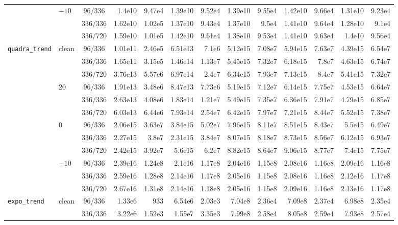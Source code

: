 \documentclass[12pt]{article}
\theoremstyle{definition}
\begin{document}
{\begin{enumerate}[label=\textbf{1.2.\arabic*}, leftmargin=*]
{\begin{longtable}{@{}llc@{\hspace{6pt}}rr@{\hspace{8pt}}rr@{\hspace{8pt}}rr@{\hspace{8pt}}rr@{\hspace{8pt}}rr@{}}
\addlinespace[2pt]
 & $-10$ & 96/336 & 1.4e10 & 9.47e4 & 1.39e10 & 9.52e4 & 1.39e10 & 9.55e4 & 1.42e10 & 9.66e4 & 1.31e10 & 9.23e4 \\
 &  & 336/336 & 1.62e10 & 1.02e5 & 1.37e10 & 9.43e4 & 1.37e10 & 9.5e4 & 1.41e10 & 9.64e4 & 1.28e10 & 9.1e4 \\
 &  & 336/720 & 1.59e10 & 1.01e5 & 1.42e10 & 9.61e4 & 1.38e10 & 9.53e4 & 1.41e10 & 9.63e4 & 1.4e10 & 9.56e4 \\
\midrule
\texttt{quadra\_trend} & clean & 96/336 & 1.01e11 & 2.46e5 & 6.51e13 & 7.1e6 & 5.12e15 & 7.08e7 & 5.94e15 & 7.63e7 & 4.39e15 & 6.54e7 \\
 &  & 336/336 & 1.65e11 & 3.15e5 & 1.46e14 & 1.13e7 & 5.45e15 & 7.32e7 & 6.18e15 & 7.8e7 & 4.63e15 & 6.74e7 \\
 &  & 336/720 & 3.76e13 & 5.57e6 & 6.97e14 & 2.4e7 & 6.34e15 & 7.93e7 & 7.13e15 & 8.4e7 & 5.41e15 & 7.32e7 \\
\addlinespace[2pt]
 & 20 & 96/336 & 1.91e13 & 3.48e6 & 8.47e13 & 7.73e6 & 5.19e15 & 7.12e7 & 6.14e15 & 7.75e7 & 4.53e15 & 6.64e7 \\
 &  & 336/336 & 2.63e13 & 4.08e6 & 1.83e14 & 1.21e7 & 5.49e15 & 7.35e7 & 6.36e15 & 7.91e7 & 4.79e15 & 6.85e7 \\
 &  & 336/720 & 6.03e13 & 6.44e6 & 7.93e14 & 2.54e7 & 6.42e15 & 7.97e7 & 7.21e15 & 8.44e7 & 5.52e15 & 7.38e7 \\
\addlinespace[2pt]
 & 0 & 96/336 & 2.06e15 & 3.63e7 & 3.84e15 & 5.02e7 & 7.96e15 & 8.11e7 & 8.51e15 & 8.43e7 & 5.5e15 & 6.49e7 \\
 &  & 336/336 & 2.27e15 & 3.8e7 & 2.31e15 & 3.84e7 & 8.07e15 & 8.18e7 & 8.73e15 & 8.56e7 & 6.12e15 & 6.93e7 \\
 &  & 336/720 & 2.42e15 & 3.92e7 & 5.6e15 & 6.2e7 & 8.82e15 & 8.64e7 & 9.06e15 & 8.77e7 & 7.4e15 & 7.75e7 \\
\addlinespace[2pt]
 & $-10$ & 96/336 & 2.39e16 & 1.24e8 & 2.1e16 & 1.17e8 & 2.04e16 & 1.15e8 & 2.08e16 & 1.16e8 & 2.09e16 & 1.16e8 \\
 &  & 336/336 & 2.59e16 & 1.28e8 & 2.14e16 & 1.17e8 & 2.05e16 & 1.15e8 & 2.08e16 & 1.16e8 & 2.12e16 & 1.17e8 \\
 &  & 336/720 & 2.67e16 & 1.31e8 & 2.14e16 & 1.18e8 & 2.05e16 & 1.15e8 & 2.09e16 & 1.16e8 & 2.13e16 & 1.17e8 \\
\midrule
\texttt{expo\_trend} & clean & 96/336 & 1.33e6 & 933 & 6.54e6 & 2.03e3 & 7.04e8 & 2.36e4 & 7.09e8 & 2.37e4 & 6.98e8 & 2.35e4 \\
 &  & 336/336 & 3.22e6 & 1.52e3 & 1.55e7 & 3.35e3 & 7.99e8 & 2.58e4 & 8.05e8 & 2.59e4 & 7.93e8 & 2.57e4 \\

\end{longtable}}
\end{enumerate}}
\end{document}
